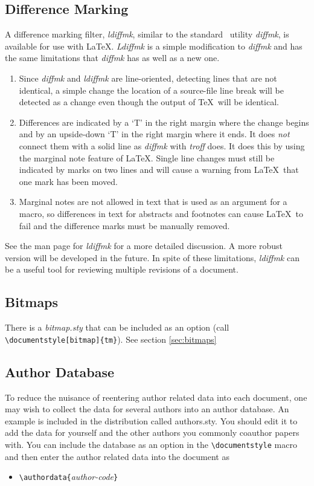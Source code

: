 \subsection{Difference Marking}
A difference marking filter, {\it ldiffmk}, similar to the standard \UNIX\
utility {\it diffmk}, is available for use with \LaTeX .  
{\it Ldiffmk} is a simple modification to {\it diffmk} and has the same limitations
that {\it diffmk} has as well as a new one. 
\begin{enumerate}
\item Since {\it diffmk} and {\it ldiffmk} are line-oriented,
detecting lines that are not identical, a simple change the location
of a source-file line break will be detected as a change even though
the output of \TeX\ will be identical.
\item Differences are indicated by a `T' in the right margin where
the change begins and by an upside-down `T' in the right margin
where it ends.  It does {\it not} connect them with a solid line as
{\it diffmk} with {\it troff} does.  It does this by using the
marginal note feature of \LaTeX .  Single line changes must still be
indicated by marks on two lines and will cause a warning from \LaTeX\
that one mark has been moved.  
\item Marginal notes are not allowed in text that is used as an
argument for a macro, so differences in text for abstracts and
footnotes can cause \LaTeX\ to fail and the difference marks must be
manually removed.
\end{enumerate}
See the man page for {\it ldiffmk} for a more detailed discussion.  A
more robust version will be developed in the future.  In spite of
these limitations, {\it ldiffmk} can be a useful tool for reviewing
multiple revisions of a document.
\subsection{Bitmaps}
There is a {\it bitmap.sty} that can be included as an option (call 
\verb|\documentstyle[bitmap]{tm}|).  See section \ref{sec:bitmaps}
\subsection{Author Database}
To reduce the nuisance of reentering author related data into each
document, one may wish to collect the data for several authors into an
author database.  An example is included in the distribution called
authors.sty.  You should edit it to add the data for yourself and the
other authors you commonly coauthor papers with.  You can include the
database as an option in the \verb|\documentstyle| macro and then
enter the author related data into the document as
\begin{itemize}
\item[]
\verb|\authordata{|{\it author-code}\verb|}|
\end{itemize}
